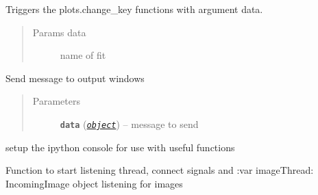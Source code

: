 \documentclass[letterpaper,10pt,english]{sphinxmanual}
\begin{document}
\begin{fulllineitems}

\begin{fulllineitems}
\label{MainWindow:SpinorMonitor.MainWindow.on_fit_name}
Triggers the plots.change\_key functions with argument data.
\begin{quote}\begin{description}
\item[{Params data}] \leavevmode
name of fit

\end{description}\end{quote}

\end{fulllineitems}


\begin{fulllineitems}
\label{MainWindow:SpinorMonitor.MainWindow.on_message}
Send message to output windows
\begin{quote}\begin{description}
\item[{Parameters}] \leavevmode
\textbf{\texttt{data}} (\href{https://docs.python.org/library/functions.html\#object}{\emph{\texttt{object}}}) -- message to send

\end{description}\end{quote}

\end{fulllineitems}


\begin{fulllineitems}
\label{MainWindow:SpinorMonitor.MainWindow.set_up_ipy}
setup the ipython console for use with useful functions

\end{fulllineitems}


\begin{fulllineitems}
\label{MainWindow:SpinorMonitor.MainWindow.start}
Function to start listening thread, connect signals and
:var imageThread: IncomingImage object listening for images


\end{fulllineitems}
\end{fulllineitems}
\end{document}

